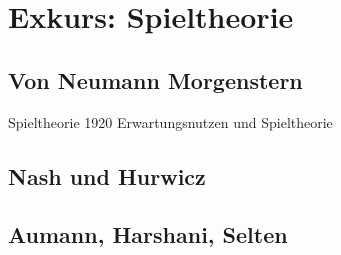 %
%
%

\chapter{Exkurs: Spieltheorie} \label{cha: Spieltheorie}
\label{Spieltheorie}

\section{Von Neumann Morgenstern}
Spieltheorie 1920
Erwartungsnutzen und Spieltheorie


\section{Nash und Hurwicz}

\section{Aumann, Harshani, Selten}




